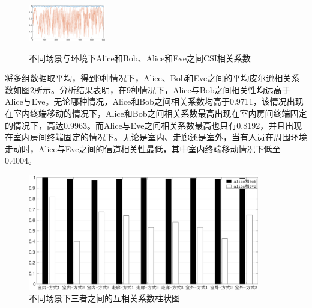 \documentclass[master]{seuthesis} %
\begin{document}
\begin{Main}
\begin{figure}
{        \includegraphics[width=0.3\textwidth]{images/tdd-xcorr/corridor-trolly-move.eps}
    }
    \quad
    \caption{不同场景与环境下Alice和Bob、Alice和Eve之间CSI相关系数}{} %
    \label{tdd_csi_xcorr}
\end{figure}

将多组数据取平均，得到9种情况下，Alice、Bob和Eve之间的平均皮尔逊相关系数如图\ref{tdd_bar_xcorr}所示。分析结果表明，在9种情况下，Alice与Bob之间相关性均远高于Alice与Eve。无论哪种情况，Alice和Bob之间相关系数均高于0.9711，该情况出现在室内终端移动的情况下，Alice和Bob之间相关系数最高出现在室内房间终端固定的情况下，高达0.9963。而Alice与Eve之间相关系数最高也只有0.8192，并且出现在室内房间终端固定的情况下。无论是室内、走廊还是室外，当有人员在周围环境走动时，Alice与Eve之间的信道相关性最低，其中室内终端移动情况下低至0.4004。

\begin{figure}[htbp!]
    \centering \includegraphics[width=0.9\textwidth]{images/tdd-xcorr/bar2.eps}
    \caption{不同场景下三者之间的互相关系数柱状图}
    \label{tdd_bar_xcorr}
\end{figure}


\end{Main}
\end{document}
